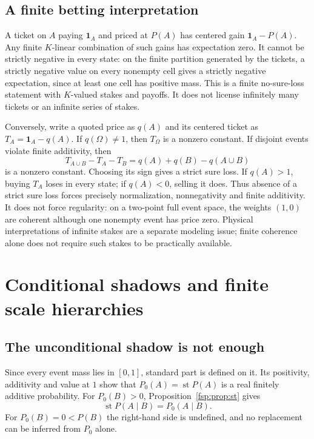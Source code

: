 \documentclass[11pt,a4paper]{article}
\numberwithin{equation}{section}
\theoremstyle{definition}
\theoremstyle{remark}
\newcommand{\st}{\operatorname{st}}
\newcommand{\ind}{\mathbf 1}
\begin{document}
\subsection{A finite betting interpretation}

A ticket on $A$ paying $\ind_A$ and priced at $P(A)$ has centered gain
$\ind_A-P(A)$. Any finite $K$-linear combination of such gains has
expectation zero. It cannot be strictly negative in every state: on the
finite partition generated by the tickets, a strictly negative value on
every nonempty cell gives a strictly negative expectation, since at least
one cell has positive mass. This is a finite no-sure-loss statement with
$K$-valued stakes and payoffs. It does not license infinitely many tickets
or an infinite series of stakes.

Conversely, write a quoted price as $q(A)$ and its centered ticket as
$T_A=\ind_A-q(A)$. If $q(\Omega)\ne1$, then $T_\Omega$ is a
nonzero constant. If disjoint events violate finite additivity, then
\[
 T_{A\cup B}-T_A-T_B=q(A)+q(B)-q(A\cup B)
\]
is a nonzero constant. Choosing its sign gives a strict sure loss.
If $q(A)>1$, buying $T_A$ loses in every state; if $q(A)<0$, selling it
does. Thus absence of a strict sure loss forces precisely normalization,
nonnegativity and finite additivity. It does not force regularity:
on a two-point full event space, the weights $(1,0)$ are coherent although
one nonempty event has price zero. Physical
interpretations of infinite stakes are a separate modeling issue; finite
coherence alone does not require such stakes to be practically available.

\section{Conditional shadows and finite scale hierarchies}
\label{fsp:sec:shadows}

\subsection{The unconditional shadow is not enough}

Since every event mass lies in $[0,1]$, standard part is defined on it.
Its positivity, additivity and value at $1$ show that
$P_0(A)=\st P(A)$ is a real finitely additive probability.
For $P_0(B)>0$, Proposition~\ref{fsp:prop:st} gives
\begin{equation}\label{fsp:eq:stcondition}
 \st P(A\mid B)=P_0(A\mid B).
\end{equation}
For $P_0(B)=0<P(B)$ the right-hand side is undefined, and no replacement
can be inferred from $P_0$ alone.
\end{document}
